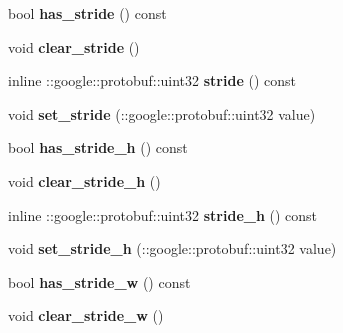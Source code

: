 \begin{DoxyCompactItemize}
bool {\bfseries has\+\_\+stride} () const
\item 
\mbox{\label{classcaffe_1_1_pooling_parameter_a9b55af9575406cedcf1a299eee932fbf}} 
void {\bfseries clear\+\_\+stride} ()
\item 
\mbox{\label{classcaffe_1_1_pooling_parameter_af95e48b7c6bec5006310e3b5e588435f}} 
inline \+::google\+::protobuf\+::uint32 {\bfseries stride} () const
\item 
\mbox{\label{classcaffe_1_1_pooling_parameter_a3245bbc57c17571938899f95982eddcb}} 
void {\bfseries set\+\_\+stride} (\+::google\+::protobuf\+::uint32 value)
\item 
\mbox{\label{classcaffe_1_1_pooling_parameter_a33efe88af6d838d84de96c64fdc296a8}} 
bool {\bfseries has\+\_\+stride\+\_\+h} () const
\item 
\mbox{\label{classcaffe_1_1_pooling_parameter_a2e1e66fba2794c6787addc139ff71c0b}} 
void {\bfseries clear\+\_\+stride\+\_\+h} ()
\item 
\mbox{\label{classcaffe_1_1_pooling_parameter_a97405c343f8786573b8814530af23c53}} 
inline \+::google\+::protobuf\+::uint32 {\bfseries stride\+\_\+h} () const
\item 
\mbox{\label{classcaffe_1_1_pooling_parameter_af64f0acb9a3a2fe1674f2481e4efa4ed}} 
void {\bfseries set\+\_\+stride\+\_\+h} (\+::google\+::protobuf\+::uint32 value)
\item 
\mbox{\label{classcaffe_1_1_pooling_parameter_a65abc8f9c2ef6c4ba864ddb25d8958a4}} 
bool {\bfseries has\+\_\+stride\+\_\+w} () const
\item 
\mbox{\label{classcaffe_1_1_pooling_parameter_aa11c967246316cc27b1932ec10e3c915}} 
void {\bfseries clear\+\_\+stride\+\_\+w} ()
\item 
\mbox{\label{classcaffe_1_1_pooling_parameter_ab7ea2b787645617bca53565828627772}} 

\end{DoxyCompactItemize}

